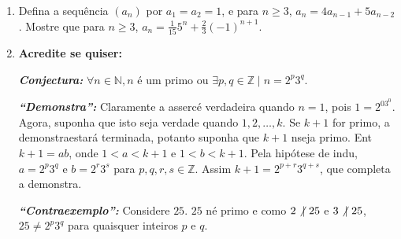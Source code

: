 \begin{enumerate}[{\bf 1.}]
\item Defina a sequ\^encia $(a_n)$ por $a_1=a_2=1$, e para $n\geq 3$, $a_n=4a_{n-1}+5a_{n-2}$. Mostre que para $n\geq 3$, $a_n=\frac{1}{15}5^n+\frac{2}{3}(-1)^{n+1}$.

\item {\bf Acredite se quiser:}  

\noindent \textit{\textbf{Conjectura:}} $\forall n\in\mathbb{N}, n$ \'e um primo ou $\exists p,q\in\mathbb{Z} \mid  n=2^p3^q$. 

\noindent \textit{\textbf{``Demonstra\caoi'':}} Claramente a asserc\ao \'e verdadeira quando $n=1$, pois $1=2^03^0$. Agora, suponha que isto seja verdade quando $1,2,\ldots,k$. Se $k+1$ for primo, a demonstra\cao estar\'a terminada, potanto suponha que $k+1$ n\ao seja primo. Ent\ao $k+1=ab$, onde $1<a<k+1$ e $1<b<k+1$. Pela hip\'otese de indu\caoi, $a=2^p3^q$ e $b=2^r3^s$ para $p,q,r,s\in\mathbb{Z}$. Assim $k+1=2^{p+r}3^{q+s}$, que completa a demonstra\caoi.

\noindent \textit{\textbf{``Contraexemplo'':}} Considere $25$. $25$ n\ao \'e primo e como $2\not|\textrm{ } 25$ e $3\not|\textrm{ } 25$, $25\neq 2^p3^q$ para quaisquer inteiros $p$ e $q$.
\end{enumerate}
